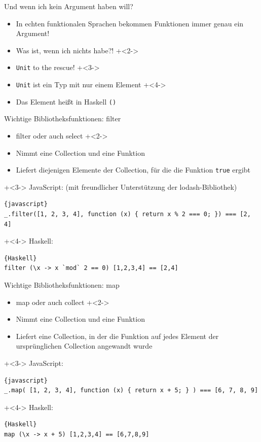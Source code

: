 \begin{frame}[fragile]{Und wenn ich kein Argument haben will?}
\begin{itemize}
\item In echten funktionalen Sprachen bekommen Funktionen immer genau ein Argument!
\item Was ist, wenn ich nichts habe?!
\onslide+<2->
\item \texttt{Unit} to the rescue!
\onslide+<3->
\item \texttt{Unit} ist ein Typ mit nur einem Element
\onslide+<4->
\item Das Element heißt in Haskell \texttt{()}
\end{itemize}
\end{frame}

\begin{frame}[fragile]{Wichtige Bibliotheksfunktionen: filter}
\begin{itemize}
\item filter oder auch select
\onslide+<2->
\item Nimmt eine Collection und eine Funktion
\item Liefert diejenigen Elemente der Collection, für die die Funktion \texttt{true} ergibt
\end{itemize}

\onslide+<3->
JavaScript: (mit freundlicher Unterstützung der lodash-Bibliothek)
\begin{lstlisting}{javascript}
_.filter([1, 2, 3, 4], function (x) { return x % 2 === 0; }) === [2, 4]
\end{lstlisting}

\onslide+<4->
Haskell:
\begin{lstlisting}{Haskell}
filter (\x -> x `mod` 2 == 0) [1,2,3,4] == [2,4]
\end{lstlisting}

\end{frame}


\begin{frame}[fragile]{Wichtige Bibliotheksfunktionen: map}
\begin{itemize}
\item map oder auch collect
\onslide+<2->
\item Nimmt eine Collection und eine Funktion
\item Liefert eine Collection, in der die Funktion auf jedes Element der ursprünglichen Collection angewandt wurde
\end{itemize}

\onslide+<3->
JavaScript:
\begin{lstlisting}{javascript}
_.map( [1, 2, 3, 4], function (x) { return x + 5; } ) === [6, 7, 8, 9]
\end{lstlisting}

\onslide+<4->
Haskell:
\begin{lstlisting}{Haskell}
map (\x -> x + 5) [1,2,3,4] == [6,7,8,9]
\end{lstlisting}

\end{frame}

